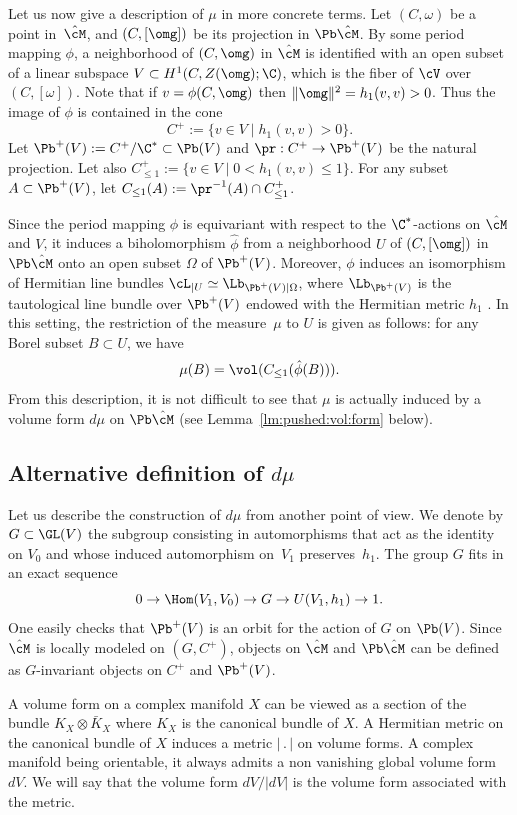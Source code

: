 Let us now give a description of $\mu$ in more concrete terms.
Let $(C,\omega)$ be a point in~$\hat{\cM}$, and $(C,[\omg])$ be its projection in $\Pb\hat{\cM}$.
By some period mapping $\phi$, a neighborhood of $(C,\omg)$ in $\hat{\cM}$ is identified with an open subset of a linear subspace $V \subset H^1(C,Z(\omg);\C)$, which is the fiber of $\cV$ over $(C,[\omega])$.
Note that if $v=\phi(C,\omg)$ then $\|\omg\|^2=h_1(v,v) >0$. Thus the image of $\phi$ is contained in the cone
\[
C^+:=\{v\in V\mid h_1(v,v)>0\}.
\]
Let $\Pb^+(V):= C^+/\C^* \subset\Pb(V)$ and $\pr : C^+ \to \Pb^+(V) $ be the natural projection.
Let also $C^+_{\leq 1} := \{ v \in V \mid 0 < h_1(v,v) \leq 1 \}$.
For any subset $A\subset \Pb^+(V)$, let $C_{\leq 1}(A):=\pr^{-1}(A)\cap C^+_{\leq 1}$.

Since the period mapping $\phi$ is equivariant with respect to the $\C^*$-actions on $\hat{\cM}$ and $V$, it induces a biholomorphism $\hat{\phi}$ from a neighborhood $U$ of $(C,[\omg])$ in $\Pb\hat{\cM}$ onto an open subset $\Omega$ of $\Pb^+(V)$.
Moreover, $\phi$ induces an isomorphism of Hermitian line bundles $\cL_{|U}\simeq \Lb_{\Pb^+(V)|\Omega}$, where $\Lb_{\Pb^+(V)}$ is the tautological line bundle over $\Pb^+(V)$ endowed with the Hermitian metric $h_1$ .
In this setting, the restriction of the measure~$\mu$ to $U$ is given as follows: for any Borel subset $B\subset U$, we have
\[ \mu(B)=\vol(C_{\leq 1}(\hat{\phi}(B))). \]
From this description, it is not difficult to see that $\mu$ is actually induced by a volume form $d\mu$ on $\Pb\hat\cM$ (see Lemma~\ref{lm:pushed:vol:form} below).

\subsection{Alternative definition of $d\mu$}\label{sec:defvolform}
Let us describe the construction of $d\mu$ from another point of view.
We denote by $G \subset \GL(V)$ the subgroup consisting in automorphisms that act as the identity on $V_0$ and whose induced automorphism on~$V_1$ preserves~$h_1$.
The group $G$ fits in an exact sequence
\[
0 \to \Hom(V_1, V_0) \to G \to U(V_1, h_1) \to 1.
\]
One easily checks that $\Pb^+(V) $ is an orbit for the action of $G$ on $\Pb(V)$.
Since $\hat\cM$ is locally modeled on $(G,C^+)$, objects on $\hat\cM$ and $\Pb\hat\cM$ can be defined as $G$-invariant objects on $C^+$ and $\Pb^+(V)$.

A volume form on a complex manifold $X$ can be viewed as a section of the bundle $K_X\otimes\bar K_X$ where $K_X$ is the canonical bundle of $X$. A Hermitian metric on the canonical bundle of $X$ induces a metric $|\,.\,|$ on volume forms. A complex manifold being orientable, it always admits a non vanishing global volume form $dV$. We will say that the volume form $dV/|dV|$ is the volume form associated with the metric.

